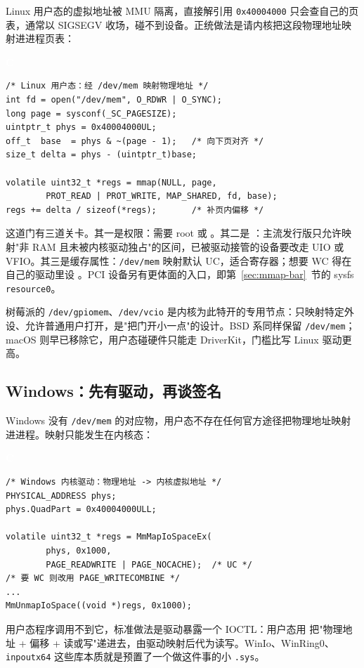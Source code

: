 \documentclass[12pt,a4paper,fontset=fandol]{ctexbook}
\newcommand{\clabel}{%
  \begin{tcolorbox}[enhanced,colback=cheadbg,colframe=cheadbg,
    arc=1mm,boxrule=0mm,left=6pt,right=6pt,top=2pt,bottom=2pt,
    halign=left,oversize]
    \textcolor{white}{\small\bfseries C}
  \end{tcolorbox}\vspace{-4pt}}
\begin{document}
Linux 用户态的虚拟地址被 MMU 隔离，直接解引用 \texttt{0x40004000} 只会查自己的页表，通常以 SIGSEGV 收场，碰不到设备。正统做法是请内核把这段物理地址映射进进程页表：

\clabel
\begin{lstlisting}[style=cstyle]
/* Linux 用户态：经 /dev/mem 映射物理地址 */
int fd = open("/dev/mem", O_RDWR | O_SYNC);
long page = sysconf(_SC_PAGESIZE);
uintptr_t phys = 0x40004000UL;
off_t  base  = phys & ~(page - 1);   /* 向下页对齐 */
size_t delta = phys - (uintptr_t)base;

volatile uint32_t *regs = mmap(NULL, page,
        PROT_READ | PROT_WRITE, MAP_SHARED, fd, base);
regs += delta / sizeof(*regs);       /* 补页内偏移 */
\end{lstlisting}

这道门有三道关卡。其一是权限：需要 root 或 。其二是 ：主流发行版只允许映射"非 RAM 且未被内核驱动独占"的区间，已被驱动接管的设备要改走 UIO 或 VFIO。其三是缓存属性：\texttt{/dev/mem} 映射默认 UC，适合寄存器；想要 WC 得在自己的驱动里设 。PCI 设备另有更体面的入口，即第~\ref{sec:mmap-bar}~节的 sysfs \texttt{resource0}。

树莓派的 \texttt{/dev/gpiomem}、\texttt{/dev/vcio} 是内核为此特开的专用节点：只映射特定外设、允许普通用户打开，是"把门开小一点"的设计。BSD 系同样保留 \texttt{/dev/mem}；macOS 则早已移除它，用户态碰硬件只能走 DriverKit，门槛比写 Linux 驱动更高。

\subsection{Windows：先有驱动，再谈签名}

Windows 没有 \texttt{/dev/mem} 的对应物，用户态不存在任何官方途径把物理地址映射进进程。映射只能发生在内核态：

\clabel
\begin{lstlisting}[style=cstyle]
/* Windows 内核驱动：物理地址 -> 内核虚拟地址 */
PHYSICAL_ADDRESS phys;
phys.QuadPart = 0x40004000ULL;

volatile uint32_t *regs = MmMapIoSpaceEx(
        phys, 0x1000,
        PAGE_READWRITE | PAGE_NOCACHE);  /* UC */
/* 要 WC 则改用 PAGE_WRITECOMBINE */
...
MmUnmapIoSpace((void *)regs, 0x1000);
\end{lstlisting}

用户态程序调用不到它，标准做法是驱动暴露一个 IOCTL：用户态用  把"物理地址 + 偏移 + 读或写"递进去，由驱动映射后代为读写。WinIo、WinRing0、\texttt{inpoutx64} 这些库本质就是预置了一个做这件事的小 \texttt{.sys}。
\end{document}
